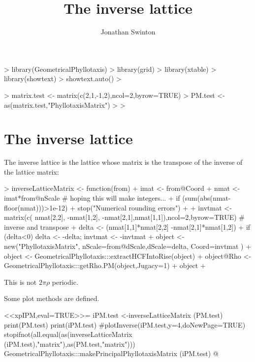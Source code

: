 \documentclass[a4paper]{article}
\begin{document}
\title{The inverse lattice}
\author{Jonathan Swinton}
\maketitle

\begin{Schunk}
\begin{Sinput}
> library(GeometricalPhyllotaxis)
> library(grid)
> library(xtable)
> library(showtext)
> showtext.auto()
> 
\end{Sinput}
\end{Schunk}
\begin{Schunk}
\begin{Sinput}
> matrix.test <- matrix(c(2,1,-1,2),ncol=2,byrow=TRUE)
> PM.test <- as(matrix.test,"PhyllotaxisMatrix")
> 
> 
\end{Sinput}
\end{Schunk}
\section{The inverse lattice}

The inverse lattice is the lattice whose matrix is the transpose of the inverse
of the lattice matrix:

\begin{Schunk}
\begin{Sinput}
> inverseLatticeMatrix <- function(from) {
+ 	imat <- from@Coord
+ 	nmat <- imat*from@nScale # hoping this will make integers...
+ 	if (sum(abs(nmat-floor(nmat)))>1e-12) {
+ 		stop("Numerical rounding errors")
+ 	}
+ 	invtmat <- matrix(c( nmat[2,2], -nmat[1,2], -nmat[2,1],nmat[1,1]),ncol=2,byrow=TRUE) # inverse and transpose
+ 	delta <- (nmat[1,1]*nmat[2,2] -nmat[2,1]*nmat[1,2])
+ 	if (delta<0) { delta <- -delta; invtmat <- -invtmat }
+ 	object <- new("PhyllotaxisMatrix", nScale=from@dScale,dScale=delta, Coord=invtmat )
+ 	object <- GeometricalPhyllotaxis:::extractHCFIntoRise(object)
+ 	object@Rho <- GeometricalPhyllotaxis:::getRho.PM(object,Jugacy=1)
+ 	object
+ }
\end{Sinput}
\end{Schunk}
This is not $2\pi\rho$ periodic.


Some plot methods are defined.


 <<xpIPM,eval=TRUE>>=
 iPM.test <-inverseLatticeMatrix (PM.test)
 print(PM.test)
 print(iPM.test)
 #plotInverse(iPM.test,y=4,doNewPage=TRUE)
 stopifnot(all.equal(as(inverseLatticeMatrix (iPM.test),"matrix"),as(PM.test,"matrix")))
 GeometricalPhyllotaxis:::makePrincipalPhyllotaxisMatrix (iPM.test)
 @
\end{document}
